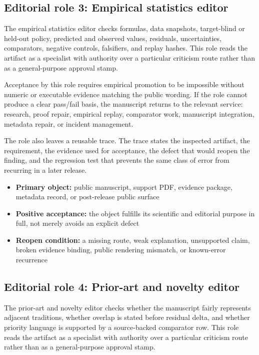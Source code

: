 \subsection{Editorial role 3: Empirical statistics editor}

The empirical statistics editor checks formulas, data snapshots, target-blind or held-out policy, predicted and observed values, residuals, uncertainties, comparators, negative controls, falsifiers, and replay hashes. This role reads the artifact as a specialist with authority over a particular criticism route rather than as a general-purpose approval stamp.


Acceptance by this role requires empirical promotion to be impossible without numeric or executable evidence matching the public wording. If the role cannot produce a clear pass/fail basis, the manuscript returns to the relevant service: research, proof repair, empirical replay, comparator work, manuscript integration, metadata repair, or incident management.


The role also leaves a reusable trace. The trace states the inspected artifact, the requirement, the evidence used for acceptance, the defect that would reopen the finding, and the regression test that prevents the same class of error from recurring in a later release.


\begin{itemize}[leftmargin=1.8em]

\item \textbf{Primary object:} public manuscript, support PDF, evidence package, metadata record, or post-release public surface

\item \textbf{Positive acceptance:} the object fulfills its scientific and editorial purpose in full, not merely avoids an explicit defect

\item \textbf{Reopen condition:} a missing route, weak explanation, unsupported claim, broken evidence binding, public rendering mismatch, or known-error recurrence

\end{itemize}

\subsection{Editorial role 4: Prior-art and novelty editor}

The prior-art and novelty editor checks whether the manuscript fairly represents adjacent traditions, whether overlap is stated before residual delta, and whether priority language is supported by a source-backed comparator row. This role reads the artifact as a specialist with authority over a particular criticism route rather than as a general-purpose approval stamp.


